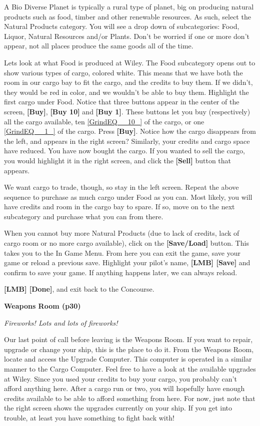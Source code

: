 \documentclass{article}
\begin{document}
A Bio Diverse Planet is typically a rural type of planet, big on producing natural products such as food, timber and other renewable resources. As such, select the Natural Products category. You will see a drop down of subcategories: Food, Liquor, Natural Resources and/or Plants. Don't be worried if one or more don't appear, not all places produce the same goods all of the time. 

Lets look at what Food is produced at Wiley. The Food subcategory opens out to show various types of cargo, colored white. This means that we have both the room in our cargo bay to fit the cargo, and the credits to buy them. If we didn't, they would be red in color, and we wouldn't be able to buy them.  Highlight the first cargo under Food. Notice that three buttons appear in the center of the screen, \textbf{[Buy]}, \textbf{[Buy 10] }and \textbf{[Buy 1]}. These buttons let you buy (respectively) all the cargo available, ten \eqref{GrindEQ__10_} of the cargo, or one \eqref{GrindEQ__1_} of the cargo. Press \textbf{[Buy]}. Notice how the cargo disappears from the left, and appears in the right screen? Similarly, your credits and cargo space have reduced. You have now bought the cargo. If you wanted to sell the cargo, you would highlight it in the right screen, and click the \textbf{[Sell]} button that appears. 



We want cargo to trade, though, so stay in the left screen. Repeat the above sequence to purchase as much cargo under Food as you can. Most likely, you will have credits and room in the cargo bay to spare. If so, move on to the next subcategory and purchase what you can from there. 

When you cannot buy more Natural Products (due to lack of credits, lack of cargo room or no more cargo available), click on the \textbf{[Save/Load] }button. This takes you to the In Game Menu. From here you can exit the game, save your game or reload a previous save. Highlight your pilot's name, \textbf{[LMB] [Save] }and confirm to save your game. If anything happens later, we can always reload. 

\textbf{[LMB] [Done]}, and exit back to the Concourse. 

\textbf{Weapons Room (p30) }

\textit{Fireworks! Lots and lots of fireworks! }

Our last point of call before leaving is the Weapons Room. If you want to repair, upgrade or change your ship, this is the place to do it. From the Weapons Room, locate and access the Upgrade Computer. This computer is operated in a similar manner to the Cargo Computer. Feel free to have a look at the available upgrades at Wiley. Since you used your credits to buy your cargo, you probably can't afford anything here. After a cargo run or two, you will hopefully have enough credits available to be able to afford something from here. For now, just note that the right screen shows the upgrades currently on your ship. If you get into trouble, at least you have something to fight back with! 
\end{document}
